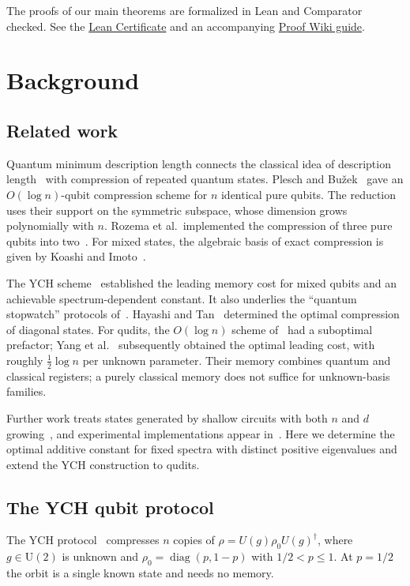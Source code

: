 \documentclass[a4paper,onecolumn,11pt]{quantumarticle}
\begin{document}
The proofs of our main theorems are formalized in Lean and Comparator checked. See the \href{https://github.com/JWang226/Quantum-Minimum-Description-Length}{Lean Certificate} and an accompanying \href{https://jwang226.github.io/Quantum-Minimum-Description-Length/}{Proof Wiki guide}.


\section{Background}\label{sec:background} 
\subsection{Related work}\label{sec:related_works}
Quantum minimum description length connects the classical idea of
description length~\cite{rissanen1978modeling} with compression of
repeated quantum states. Plesch and Bu\v{z}ek~\cite{plesch2010efficient}
gave an $O(\log n)$-qubit compression scheme for $n$ identical pure
qubits. The reduction uses their support on the symmetric subspace,
whose dimension grows polynomially with $n$. Rozema et al.~implemented
the compression of three pure qubits into two~\cite{rozema2014quantum}.
For mixed states, the algebraic basis of exact compression is given
by Koashi and Imoto~\cite{koashi2001compressibility,koashi2001possible}.

The YCH scheme~\cite{yang2016optimal} established the leading memory
cost for mixed qubits and an achievable spectrum-dependent constant.
It also underlies the ``quantum stopwatch'' protocols
of~\cite{yang2018quantum,yang2018compressionfor}.
Hayashi and Tan~\cite{hayashi2017minimum} determined the optimal
compression of diagonal states. For qudits, the $O(\log n)$ scheme
of~\cite{yang2016efficient} had a suboptimal prefactor;
Yang et al.~\cite{yang2018compression} subsequently obtained the
optimal leading cost, with roughly $\frac12\log n$ per unknown
parameter. Their memory combines quantum and classical registers;
a purely classical memory does not suffice for unknown-basis families.

Further work treats states generated by shallow circuits with both
$n$ and $d$ growing~\cite{yang2025compression}, and experimental
implementations appear in~\cite{pivoluska2022implementation,xu2024experimental}.
Here we determine the optimal additive constant for fixed spectra
with distinct positive eigenvalues and extend the YCH construction
to qudits.


\subsection{The YCH qubit protocol}\label{sec:review}
The YCH protocol~\cite{yang2016optimal} compresses $n$ copies of
$\rho=U(g)\rho_0U(g)^\dagger$, where $g\in\mathrm U(2)$ is unknown
and $\rho_0=\operatorname{diag}(p,1-p)$ with $1/2<p\le1$.
At $p=1/2$ the orbit is a single known state and needs no memory.
\end{document}
